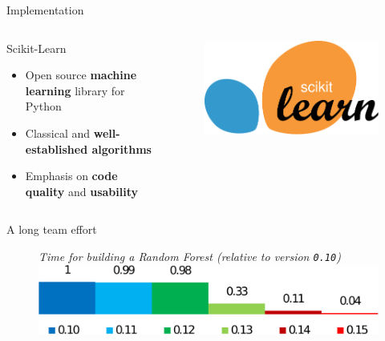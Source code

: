 \documentclass{beamer}
\begin{document}
\begin{frame}{Implementation}

\begin{columns}
\begin{column}[t]{0.7\textwidth}
\begin{block}{Scikit-Learn}
\begin{itemize}
    \item Open source {\bf machine learning} library for Python
    \item Classical and {\bf well-established algorithms}
    \item Emphasis on {\bf code quality} and {\bf usability}
\end{itemize}
\end{block}
\end{column}
\begin{column}[t]{0.20\textwidth}
    \begin{figure}
    \includegraphics[scale=0.35]{./figures/scikit-learn-logo.pdf}
    \end{figure}
\end{column}
\end{columns}

\begin{block}{A long team effort}
\begin{figure}
\vspace{-0.25cm}
{\small \it Time for building a Random Forest (relative to version \texttt{0.10})}\\[1ex]
  \includegraphics[scale=0.5]{./figures/fit-time.pdf}
\end{figure}
\end{block}

\end{frame}
\end{document}
